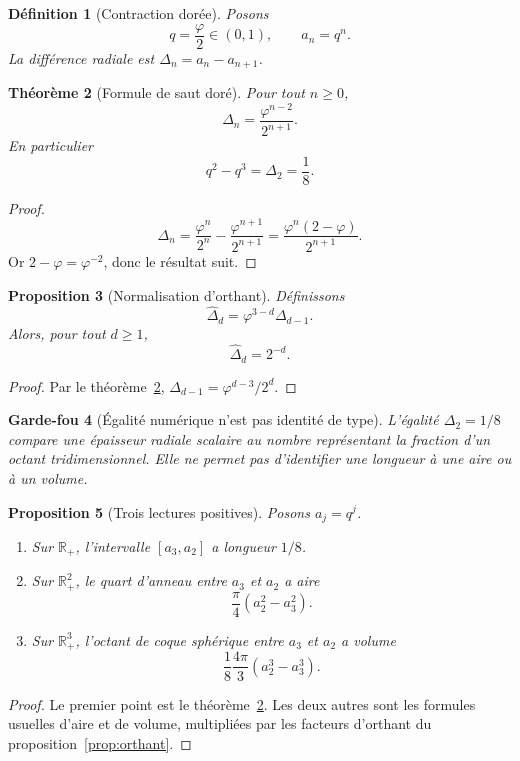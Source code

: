 \documentclass[11pt,a4paper]{article}
\newtheorem{theorem}{Théorème}[section]
\newtheorem{proposition}[theorem]{Proposition}
\newtheorem{definition}[theorem]{Définition}
\newtheorem{guardrail}[theorem]{Garde-fou}
\newcommand{\Rp}{\mathbb R_{+}}
\newcommand{\ph}{\varphi}
\begin{document}
\begin{definition}[Contraction dorée]
Posons
\[
 q=\frac{\ph}{2}\in(0,1),\qquad a_n=q^n.
\]
La différence radiale est $\Delta_n=a_n-a_{n+1}$.
\end{definition}

\begin{theorem}[Formule de saut doré]\label{thm:goldjump}
Pour tout $n\ge0$,
\[
 \Delta_n=\frac{\ph^{n-2}}{2^{n+1}}.
\]
En particulier
\[
 q^2-q^3=\Delta_2=\frac18.
\]
\end{theorem}

\begin{proof}
\[
 \Delta_n=\frac{\ph^n}{2^n}-\frac{\ph^{n+1}}{2^{n+1}}
 =\frac{\ph^n(2-\ph)}{2^{n+1}}.
\]
Or $2-\ph=\ph^{-2}$, donc le résultat suit.
\end{proof}

\begin{proposition}[Normalisation d'orthant]
Définissons
\[
 \widehat\Delta_d=\ph^{3-d}\Delta_{d-1}.
\]
Alors, pour tout $d\ge1$,
\[
 \widehat\Delta_d=2^{-d}.
\]
\end{proposition}

\begin{proof}
Par le théorème~\ref{thm:goldjump}, $\Delta_{d-1}=\ph^{d-3}/2^d$.
\end{proof}

\begin{guardrail}[Égalité numérique n'est pas identité de type]
L'égalité $\Delta_2=1/8$ compare une épaisseur radiale scalaire au nombre représentant la fraction d'un octant tridimensionnel. Elle ne permet pas d'identifier une longueur à une aire ou à un volume.
\end{guardrail}

\begin{proposition}[Trois lectures positives]
Posons $a_j=q^j$.
\begin{enumerate}[label=\textup{(\roman*)}]
\item Sur $\Rp$, l'intervalle $[a_3,a_2]$ a longueur $1/8$.
\item Sur $\Rp^2$, le quart d'anneau entre $a_3$ et $a_2$ a aire
\[
 \frac{\pi}{4}(a_2^2-a_3^2).
\]
\item Sur $\Rp^3$, l'octant de coque sphérique entre $a_3$ et $a_2$ a volume
\[
 \frac18\frac{4\pi}{3}(a_2^3-a_3^3).
\]
\end{enumerate}
\end{proposition}

\begin{proof}
Le premier point est le théorème~\ref{thm:goldjump}. Les deux autres sont les formules usuelles d'aire et de volume, multipliées par les facteurs d'orthant du proposition~\ref{prop:orthant}.
\end{proof}
\end{document}

